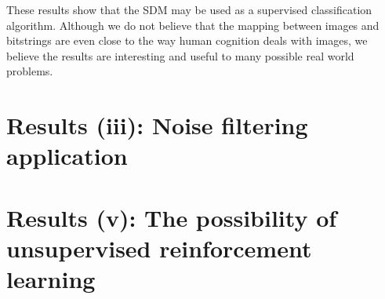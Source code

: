 These results show that the SDM may be used as a supervised classification algorithm. Although we do not believe that the mapping between images and bitstrings are even close to the way human cognition deals with images, we believe the results are interesting and useful to many possible real world problems.


\section{Results (iii): Noise filtering application}




\section{Results (v): The possibility of unsupervised reinforcement learning}
